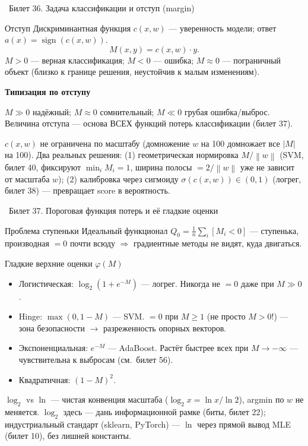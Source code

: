 \documentclass[12pt, a4paper]{article}
\newcommand{\bilet}[2]{%
  \vspace{10pt}%
  \noindent\colorbox{qcolor}{\parbox{\dimexpr\linewidth-2\fboxsep\relax}{%
    \color{white}\large\bfseries\strut\ Билет #1. #2%
  }}%
  \nopagebreak\vspace{5pt}\par\nopagebreak%
}
\newcommand{\qsub}[1]{%
  \vspace{5pt}%
  {\bfseries\color{defblue} #1}%
  \par\vspace{2pt}%
}
\newcommand{\sign}{\operatorname{sign}}
\newcommand{\norm}[1]{\left\lVert #1 \right\rVert}
\begin{document}
\bilet{36}{Задача классификации и отступ (margin)}

\begin{defbox}{Отступ}
Дискриминантная функция $c(x,w)$ --- уверенность модели; ответ $a(x)=\sign(c(x,w))$.
\[
  M(x,y) = c(x,w)\cdot y.
\]
$M>0$ --- верная классификация; $M<0$ --- ошибка; $M\approx0$ --- пограничный объект (близко к границе решения, неустойчив к малым изменениям).
\end{defbox}

\qsub{Типизация по отступу}
$M\gg0$ надёжный; $M\approx0$ сомнительный; $M\ll0$ грубая ошибка/выброс. Величина отступа --- основа ВСЕХ функций потерь классификации (билет 37).

\begin{fishkabox}
$c(x,w)$ не ограничена по масштабу (домножение $w$ на 100 домножает все $|M|$ на 100). Два реальных решения: (1) геометрическая нормировка $M/\norm{w}$ (SVM, билет 40, фиксируют $\min_i M_i=1$, ширина полосы $=2/\norm{w}$ уже не зависит от масштаба $w$); (2) калибровка через сигмоиду $\sigma(c(x,w))\in(0,1)$ (логрег, билет 38) --- превращает score в вероятность.
\end{fishkabox}

\bilet{37}{Пороговая функция потерь и её гладкие оценки}

\begin{propbox}{Проблема ступеньки}
Идеальный функционал $Q_0=\frac1n\sum_i[M_i<0]$ --- ступенька, производная $=0$ почти всюду $\Rightarrow$ градиентные методы не видят, куда двигаться.
\end{propbox}

\begin{defbox}{Гладкие верхние оценки $\varphi(M)$}
\begin{itemize}
  \item Логистическая: $\log_2(1+e^{-M})$ --- логрег. Никогда не $=0$ даже при $M\gg0$.
  \item Hinge: $\max(0,1-M)$ --- SVM. $=0$ при $M\ge1$ (не просто $M>0$!) --- зона безопасности $\to$ разреженность опорных векторов.
  \item Экспоненциальная: $e^{-M}$ --- AdaBoost. Растёт быстрее всех при $M\to-\infty$ --- чувствительна к выбросам (см.\ билет 56).
  \item Квадратичная: $(1-M)^2$.
\end{itemize}
\end{defbox}

\begin{fishkabox}
$\log_2$ vs $\ln$ --- чистая конвенция масштаба ($\log_2 x=\ln x/\ln2$), argmin по $w$ не меняется. $\log_2$ здесь --- дань информационной рамке (биты, билет 22); индустриальный стандарт (sklearn, PyTorch) --- $\ln$ через прямой вывод MLE (билет 10), без лишней константы.
\end{fishkabox}
\end{document}
